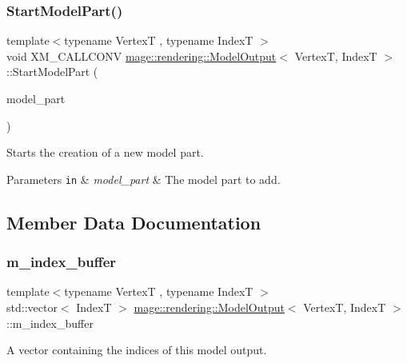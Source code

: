 \subsubsection{\texorpdfstring{Start\+Model\+Part()}{StartModelPart()}}
{\footnotesize\ttfamily template$<$typename VertexT , typename IndexT $>$ \\
void X\+M\+\_\+\+C\+A\+L\+L\+C\+O\+NV \mbox{\hyperlink{structmage_1_1rendering_1_1_model_output}{mage\+::rendering\+::\+Model\+Output}}$<$ VertexT, IndexT $>$\+::Start\+Model\+Part (\begin{DoxyParamCaption}\item[{\mbox{\hyperlink{structmage_1_1rendering_1_1_model_part}{Model\+Part}}}]{model\+\_\+part }\end{DoxyParamCaption})}

Starts the creation of a new model part.


\begin{DoxyParams}[1]{Parameters}
\mbox{\tt in}  & {\em model\+\_\+part} & The model part to add. \\
\hline
\end{DoxyParams}


\subsection{Member Data Documentation}
\mbox{\label{structmage_1_1rendering_1_1_model_output_a0290ea3f7afa5022cedbc9bc316d24e0}} 
\subsubsection{\texorpdfstring{m\+\_\+index\+\_\+buffer}{m\_index\_buffer}}
{\footnotesize\ttfamily template$<$typename VertexT , typename IndexT $>$ \\
std\+::vector$<$ IndexT $>$ \mbox{\hyperlink{structmage_1_1rendering_1_1_model_output}{mage\+::rendering\+::\+Model\+Output}}$<$ VertexT, IndexT $>$\+::m\+\_\+index\+\_\+buffer}

A vector containing the indices of this model output. \mbox{\label{structmage_1_1rendering_1_1_model_output_a7d290dd28d6cef9f33eead6cf30f042f}} 
